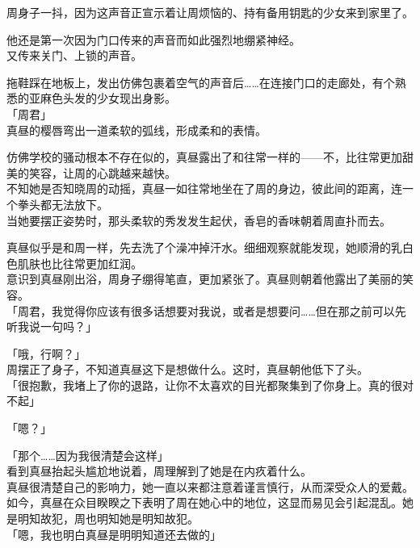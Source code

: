 周身子一抖，因为这声音正宣示着让周烦恼的、持有备用钥匙的少女来到家里了。

他还是第一次因为门口传来的声音而如此强烈地绷紧神经。\\

又传来关门、上锁的声音。

拖鞋踩在地板上，发出仿佛包裹着空气的声音后……在连接门口的走廊处，有个熟悉的亚麻色头发的少女现出身影。\\

「周君」\\

真昼的樱唇弯出一道柔软的弧线，形成柔和的表情。

仿佛学校的骚动根本不存在似的，真昼露出了和往常一样的——不，比往常更加甜美的笑容，让周的心跳越来越快。\\

不知她是否知晓周的动摇，真昼一如往常地坐在了周的身边，彼此间的距离，连一个拳头都无法放下。\\

当她要摆正姿势时，那头柔软的秀发发生起伏，香皂的香味朝着周直扑而去。

真昼似乎是和周一样，先去洗了个澡冲掉汗水。细细观察就能发现，她顺滑的乳白色肌肤也比往常更加红润。\\

意识到真昼刚出浴，周身子绷得笔直，更加紧张了。真昼则朝着他露出了美丽的笑容。\\

「周君，我觉得你应该有很多话想要对我说，或者是想要问……但在那之前可以先听我说一句吗？」

「哦，行啊？」\\

周摆正了身子，不知道真昼这下是想做什么。这时，真昼朝他低下了头。\\

「很抱歉，我堵上了你的退路，让你不太喜欢的目光都聚集到了你身上。真的很对不起」

「嗯？」

「那个……因为我很清楚会这样」\\

看到真昼抬起头尴尬地说着，周理解到了她是在内疚着什么。\\

真昼很清楚自己的影响力，她一直以来都注意着谨言慎行，从而深受众人的爱戴。如今，真昼在众目睽睽之下表明了周在她心中的地位，这显而易见会引起混乱。她是明知故犯，周也明知她是明知故犯。\\

「嗯，我也明白真昼是明明知道还去做的」


